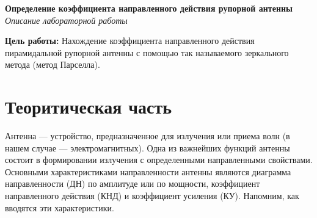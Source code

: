 


% 
\begin{titlepage}
    \vspace*{\fill}
    \begin{center}
        \Huge \textbf{Определение коэффициента направленного действия рупорной антенны}
        \vskip 30pt \normalsize \textit{Описание лабораторной работы}
    \end{center}
    \vspace*{\fill}
\end{titlepage}

{\bfseries Цель работы:} 
Нахождение коэффициента направленного действия пирамидальной рупорной антенны с помощью так называемого зеркального
метода (метод Парселла).

\section{Теоритическая часть}

Антенна — устройство, предназначенное для излучения или приема волн (в нашем случае — электромагнитных). Одна из
важнейших функций антенны состоит в формировании излучения с определенными направленными свойствами. Основными
характеристиками направленности антенны являются диаграмма направленности (ДН) по амплитуде или по мощности, коэффициент
 направленного действия (КНД) и коэффициент усиления (КУ). Напомним, как вводятся эти характеристики.

